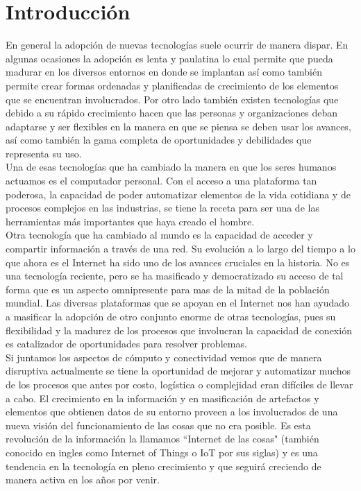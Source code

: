

\chapter{Introducción}
En general la adopción de nuevas tecnologías suele ocurrir de manera dispar. En algunas ocasiones la adopción es lenta y paulatina lo cual permite que pueda madurar en los diversos entornos en donde se implantan así como también permite crear formas ordenadas y planificadas de crecimiento de los elementos que se encuentran involucrados. Por otro lado también existen tecnologías que debido a su rápido crecimiento hacen que las personas y organizaciones deban adaptarse y ser flexibles en la manera en que se piensa se deben usar los avances, así como también la gama completa de oportunidades y debilidades que representa su uso.\\ 

Una de esas tecnologías que ha cambiado la manera en que los seres humanos actuamos es el computador personal. Con el acceso a una plataforma tan poderosa, la capacidad de poder automatizar elementos de la vida cotidiana y de procesos complejos en las industrias, se tiene la receta para ser una de las herramientas más importantes que haya creado el hombre. \\

Otra tecnología que ha cambiado al mundo es la capacidad de acceder y compartir información a través de una red. Su evolución a lo largo del tiempo a lo que ahora es el Internet ha sido uno de los avances cruciales en la historia. No es una tecnología reciente, pero se ha masificado y democratizado su acceso de tal forma que es un aspecto omnipresente para mas de la mitad de la población mundial. Las diversas plataformas que se apoyan en el Internet nos han ayudado a masificar la adopción de otro conjunto enorme de otras tecnologías, pues su flexibilidad y la madurez de los procesos que involucran la capacidad de conexión es catalizador de oportunidades para resolver problemas.\\

Si juntamos los aspectos de cómputo y conectividad vemos que de manera disruptiva actualmente se tiene la oportunidad de mejorar y automatizar muchos de los procesos que antes por costo, logística o complejidad eran difíciles de llevar a cabo. El crecimiento en la información y en masificación de artefactos y elementos que obtienen datos de su entorno proveen a los involucrados de una nueva visión del funcionamiento de las cosas que no era posible. Es esta revolución de la información la llamamos ``Internet de las cosas" (también conocido en ingles como Internet of Things o IoT por sus siglas) y es una tendencia en la tecnología en pleno crecimiento y que seguirá creciendo de manera activa en los años por venir.\\ 

